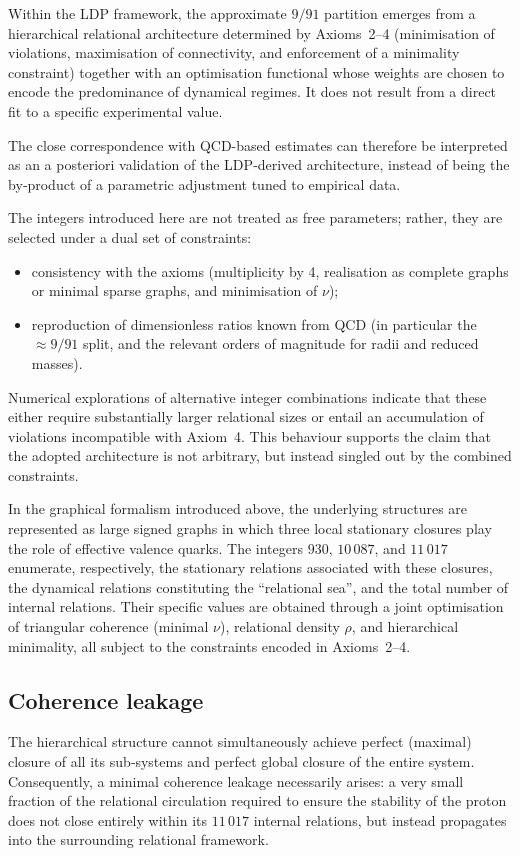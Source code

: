 \documentclass[11pt,a4paper]{article}
\begin{document}
Within the LDP framework, the approximate \(9/91\) partition emerges from a hierarchical relational architecture determined by Axioms~2–4 (minimisation of violations, maximisation of connectivity, and enforcement of a minimality constraint) together with an optimisation functional whose weights are chosen to encode the predominance of dynamical regimes. It does not result from a direct fit to a specific experimental value. 

The close correspondence with QCD-based estimates can therefore be interpreted as an a posteriori validation of the LDP‑derived architecture, instead of being the by‑product of a parametric adjustment tuned to empirical data. 

The integers introduced here are not treated as free parameters; rather, they are selected under a dual set of constraints:
\begin{itemize}[label=-]
  \item consistency with the axioms (multiplicity by 4, realisation as complete graphs or minimal sparse graphs, and minimisation of \(\nu\));
  \item reproduction of dimensionless ratios known from QCD (in particular the \(\approx 9/91\) split, and the relevant orders of magnitude for radii and reduced masses).
\end{itemize}
Numerical explorations of alternative integer combinations indicate that these either require substantially larger relational sizes or entail an accumulation of violations incompatible with Axiom~4. This behaviour supports the claim that the adopted architecture is not arbitrary, but instead singled out by the combined constraints. 

In the graphical formalism introduced above, the underlying structures are represented as large signed graphs in which three local stationary closures play the role of effective valence quarks. The integers \(930\), \(10\,087\), and \(11\,017\) enumerate, respectively, the stationary relations associated with these closures, the dynamical relations constituting the “relational sea”, and the total number of internal relations. Their specific values are obtained through a joint optimisation of triangular coherence (minimal \(\nu\)), relational density \(\rho\), and hierarchical minimality, all subject to the constraints encoded in Axioms~2–4.

\subsection{Coherence leakage}
The hierarchical structure cannot simultaneously achieve perfect (maximal) closure of all its sub‑systems and perfect global closure of the entire system. Consequently, a minimal coherence leakage necessarily arises: a very small fraction of the relational circulation required to ensure the stability of the proton does not close entirely within its \(11\,017\) internal relations, but instead propagates into the surrounding relational framework. 
\end{document}
